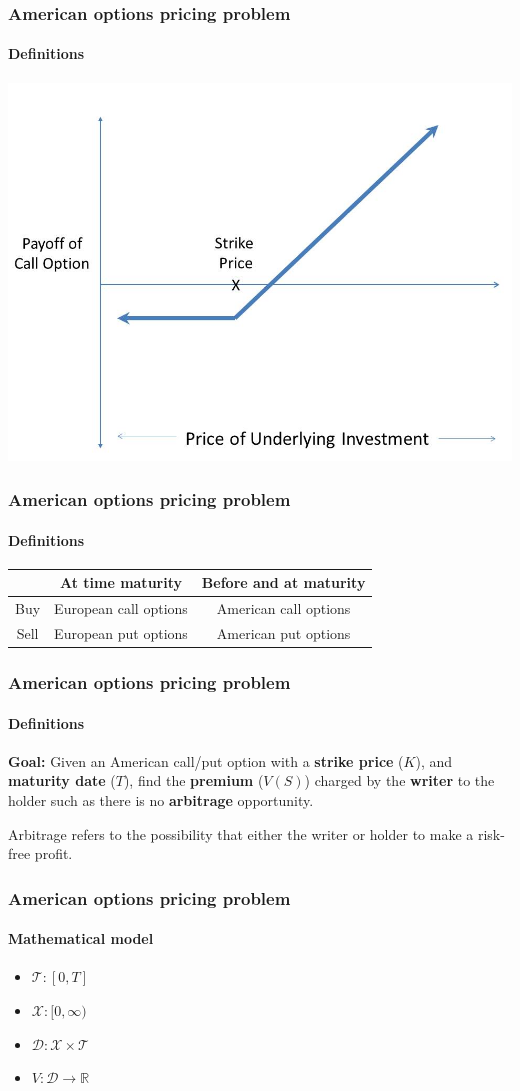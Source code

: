 \documentclass{beamer}
\begin{document}
\begin{frame}
\frametitle{American options pricing problem}
\framesubtitle{Definitions}
\centering
\includegraphics[width=.9\textwidth]{images/Call_Option}

\end{frame}

\begin{frame}
    \frametitle{American options pricing problem}
    \framesubtitle{Definitions}
    \centering
    \begin{tabular}{ |c|c|c| }
        \hline
            & At time maturity & Before and at maturity \\ \hline
        Buy & European call options & American call options \\  \hline
        Sell & European put options & American put options \\ \hline
    \end{tabular}
\end{frame} 

\begin{frame}
    \frametitle{American options pricing problem}
    \framesubtitle{Definitions}
    \textbf{Goal:}
    Given an American call/put option with a \textbf{strike price} ($K$), 
    and \textbf{maturity date} ($T$), find the \textbf{premium} ($V(S)$) charged 
    by the \textbf{ writer} to the holder such as there is no \textbf{arbitrage} 
    opportunity.

    Arbitrage refers to the possibility that either the writer or holder to make a risk-free profit. 
\end{frame}

\begin{frame}
    \frametitle{American options pricing problem}
    \framesubtitle{Mathematical model}
    \begin{itemize}
        \item $\mathcal{T}: [0, T]$
        \item $\mathcal{X}: [0, \infty)$
        \item $\mathcal{D}: \mathcal{X}\times\mathcal{T}$
        \item $V: \mathcal{D} \rightarrow \mathbb{R}$
    \end{itemize}
\end{frame}
\end{document}
